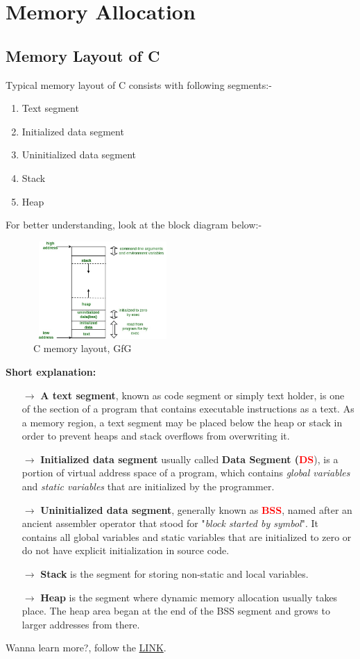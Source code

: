 \documentclass[11 pt]{book}
\begin{document}
\section{Memory Allocation}
\subsection{Memory Layout of C}
Typical memory layout of C consists with following segments:-
\begin{enumerate}
	\item Text segment
	\item Initialized data segment
	\item Uninitialized data segment
	\item Stack
	\item Heap
\end{enumerate}
For better understanding, look at the block diagram below:-\\
\begin{figure}
	\centering
	\includegraphics[width=200px, height=140px]{C memory layout, GfG.png}
	\caption{C memory layout, GfG}
\end{figure}
\pagebreak

\textbf{Short explanation:}
\begin{itemize}
	\item[$\rightarrow$] \textbf{A text segment}, known as code segment or simply text holder, is one of the section of a program that contains executable instructions as a text. As a memory region, a text segment may be placed below the heap or stack in order to prevent heaps and stack overflows from overwriting it.
	\item[$\rightarrow$] \textbf{Initialized data segment} usually called \textbf{Data Segment (\textcolor{red}{DS}}), is a portion of virtual address space of a program, which contains \textit{global variables} and \textit{static variables} that are initialized by the programmer.
	\item[$\rightarrow$] \textbf{Uninitialized data segment}, generally known as \textbf{\textcolor{red}{BSS}}, named after an ancient assembler operator that stood for "\textit{block started by symbol}". It contains all global variables and static variables that are initialized to zero or do not have explicit initialization in source code.
	\item[$\rightarrow$] \textbf{Stack} is the segment for storing non-static and local variables.
	\item[$\rightarrow$] \textbf{Heap} is the segment where dynamic memory allocation usually takes place. The heap area began at the end of the BSS segment and grows to larger addresses from there.
\end{itemize}
Wanna learn more?, follow the \href{https://www.geeksforgeeks.org/memory-layout-of-c-program/}{LINK}.
\end{document}
